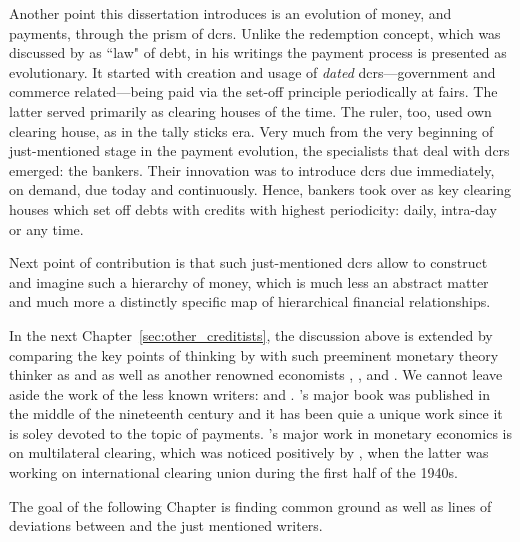 Another point this dissertation introduces is an evolution of money, and payments, through the prism of \acfp{dcr}. Unlike the redemption concept, which was discussed by \citeauthor{innes1913} as ``law" of debt, in his writings the payment process is presented as evolutionary. It started with creation and usage of \textit{dated} \acp{dcr}---government and commerce related---being paid via the set-off principle periodically at fairs. The latter served primarily as clearing houses of the time. The ruler, too, used own clearing house, as in the tally sticks era. Very much from the very beginning of just-mentioned stage in the payment evolution, the specialists that deal with \acp{dcr} emerged: the bankers. Their innovation was to introduce \acp{dcr} due immediately, on demand, due today and continuously. Hence, bankers took over as key clearing houses which set off debts with credits with highest periodicity: daily, intra-day or any time. 

Next point of contribution is that such just-mentioned \acp{dcr} allow to construct and imagine such a hierarchy of money, which is much less an abstract matter and much more a distinctly specific map of hierarchical financial relationships. 

In the next Chapter~\ref{sec:other_creditists}, the discussion above is extended by comparing the key points of thinking by \citeauthor{innes1913} with such preeminent monetary theory thinker as \citeauthor{keynes1930a} and as well as another renowned economists \citeauthor{commons1936}, \citeauthor{schumpeter1934}, and \citeauthor{minsky1986}. We cannot leave aside the work of the less known writers: \citeauthor{colwell1859} and \citeauthor{schumacher1943}. \citeauthor{colwell1859}'s major book was published in the middle of the nineteenth century and it has been quie a unique work since it is soley devoted to the topic of payments. \citeauthor{schumacher1943}'s major work in monetary economics is on multilateral clearing, which was noticed positively by \citeauthor{keynes1930a}, when the latter was working on international clearing union during the first half of the 1940s.

The goal of the following Chapter is finding common ground as well as lines of deviations between \citeauthor{innes1913} and the just mentioned writers.


